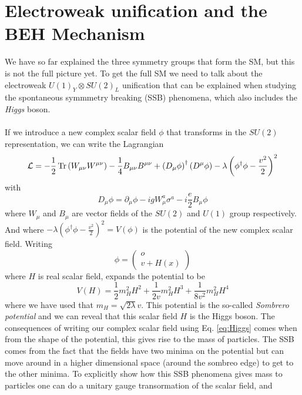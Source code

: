 \documentclass[12pt, a4paper]{book}
\begin{document}
\section{Electroweak unification and the BEH Mechanism}
We have so far explained the three symmetry groups that form the SM, but this is not the full picture yet. To get the full SM we need to talk about the electroweak $U(1)_Y\otimes SU(2)_L$ unification that can be explained when studying the spontaneous symmmetry breaking (SSB) phenomena, 
which also includes the \textit{Higgs} boson. \\
\\If we introduce a new complex scalar field $\phi$ that transforms in the $SU(2)$ representation, we can write the Lagrangian
\begin{equation}\label{eq:electroweak}
    \mathcal{L}=-\frac{1}{2}\Tr\left(W_{\mu\nu}W^{\mu\nu}\right)-\frac{1}{4}B_{\mu\nu}B^{\mu\nu}+\left(D_\mu \phi\right)^\dagger\left(D^\mu \phi\right) -\lambda\left(\phi^\dagger \phi -\frac{v^2}{2}\right)^2
\end{equation}
with 
\begin{equation}\label{eq:covar_higgs}
    D_\mu \phi =\partial_\mu \phi -igW_\mu^a\sigma^a-i\frac{e}{2}B_\mu \phi
\end{equation}
where $W_\mu$ and $B_\mu$ are vector fields of the $SU(2)$ and $U(1)$ group respectively. And where $ -\lambda\left(\phi^\dagger \phi -\frac{v^2}{2}\right)^2 = V(\phi)$ is the potential of the new complex scalar field. 
Writing 
\begin{equation}\label{eq:Higgs}
    \phi = \begin{pmatrix}
        o\\v+H(x)
    \end{pmatrix}
\end{equation}
where $H$ is real scalar field, expands the potential to be
\begin{equation}\label{eq:sombrero}
    V(H) =\frac{1}{2}m_H^2H^2 + \frac{1}{2v}m_H^2H^3 +\frac{1}{8v^2}m_H^2H^4
\end{equation}
where we have used that $m_H = \sqrt{2\lambda}v$. This potential is the so-called \textit{Sombrero potential} and we can reveal that this scalar field $H$ is the Higgs boson. 
The consequences of writing our complex scalar field using Eq. \ref{eq:Higgs} comes when from the shape of the potential, this gives rise to the mass of particles. The SSB comes from the fact that the fields have two minima 
on the potential but can move around in a higher dimensional space (around the sombreo edge) to get to the other minima. To explicitly show how this SSB phenomena gives mass to particles one can do a unitary gauge transormation of the scalar field, and 
\end{document}
